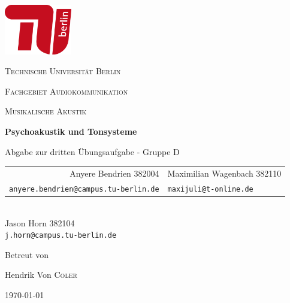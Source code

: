 \begin{titlepage}
    \centering
    \includegraphics[height=62pt]{tu_red.png}\par
    {\scshape\huge Technische Universität Berlin \par}
    {\scshape\Large Fachgebiet Audiokommunikation\par}
    \vspace{1.5cm}
    {\scshape\LARGE Musikalische Akustik\par}
    \vspace{1.5cm}

    {\Huge\bfseries {Psychoakustik und Tonsysteme}\par}
    \vspace{0.1cm}
    {\large Abgabe zur dritten Übungsaufgabe - Gruppe D \par}
    \vspace{1cm}

    {\itshape
        \begin{tabular}{rl}
          Anyere Bendrien 382004 &
          Maximilian Wagenbach 382110 \\
          \vspace{0.2cm}
          \small \texttt{anyere.bendrien@campus.tu-berlin.de} &
          \small \texttt{maxijuli@t-online.de}
        \end{tabular}\\
        Jason Horn 382104 \\
        \small \texttt{j.horn@campus.tu-berlin.de} 
    }
    \vfill
    
    Betreut von\par
    Hendrik Von \textsc{Coler}
    \vspace{1cm}
    
    {\large \today\par}
\end{titlepage}